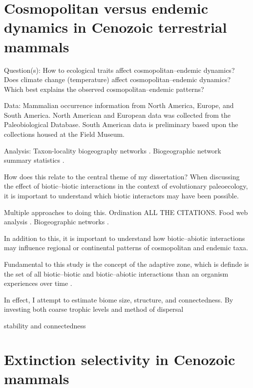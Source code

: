 \documentclass[12pt,letterpaper]{article}
\begin{document}
\section{Cosmopolitan versus endemic dynamics in Cenozoic terrestrial mammals}

Question(s): How to ecological traits affect cosmopolitan--endemic dynamics? Does climate change (temperature) affect cosmopolitan--endemic dynamics? Which best explains the observed cosmopolitan--endemic patterns?

Data: Mammalian occurrence information from North America, Europe, and South America. North American and European data was collected from the Paleobiological Database. South American data is preliminary based upon the collections housed at the Field Museum.

Analysis: Taxon-locality biogeography networks \citep{Sidor2013,Vilhena2013}. Biogeographic network summary statistics \citep{Sidor2013}.

How does this relate to the central theme of my dissertation? When discussing the effect of biotic--biotic interactions in the context of evolutionary paleoecology, it is important to understand which biotic interactors may have been possible.

Multiple approaches to doing this. Ordination ALL THE CITATIONS. Food web analysis \citep{Angielczyk2005,Roopnarine2010,Roopnarine2007,Roopnarine2006,Mitchell2012}. Biogeographic networks \citep{Sidor2013,Vilhena2013}.

In addition to this, it is important to understand how biotic--abiotic interactions may influence regional or continental patterns of cosmopolitan and endemic taxa.

Fundamental to this study is the concept of the adaptive zone, which is definde is the set of all biotic--biotic and biotic--abiotic interactions than an organism experiences over time \citep{Simpson1944,Liow2011a,VanValen1973,Valen1985}. 

In effect, I attempt to estimate biome size, structure, and connectedness. By investing both coarse trophic levels and method of dispersal

stability and connectedness



\section{Extinction selectivity in Cenozoic mammals}
\citep{Quental2013,Liow2009,Liow2008}
\end{document}
